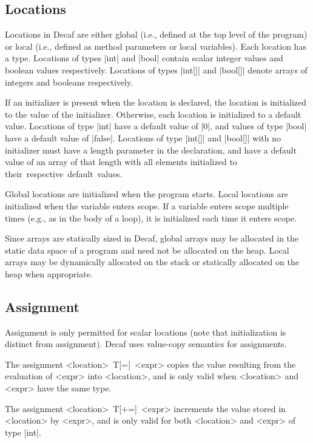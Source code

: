 \documentclass[11pt]{article}
\begin{document}
\subsection{Locations}

Locations in Decaf are either global (i.e., defined at the top level of the program) or local (i.e., defined as method parameters or local variables).
Each location has a type.
Locations of types \decaf|int| and \decaf|bool| contain scalar integer values and boolean values respectively.
Locations of types \decaf|int[]| and \decaf|bool[]| denote arrays of integers and booleans respectively.

If an initializer is present when the location is declared, the location is initialized to the value of the initializer.
Otherwise, each location is initialized to a default value.
Locations of type \decaf|int| have a default value of \decaf|0|, and values of type \decaf|bool| have a default value of \decaf|false|.
Locations of type \decaf|int[]| and \decaf|bool[]| with no initializer must have a length parameter in the declaration, and have a default value of an array of that length with all elements initialized to their~respective~default~values.

Global locations are initialized when the program starts.
Local locations are initialized when the variable enters scope.
If a variable enters scope multiple times (e.g., as in the body of a loop), it is initialized each time it enters scope.

Since arrays are statically sized in Decaf, global arrays may be allocated in the static data space of a program and need not be allocated on the heap.
Local arrays may be dynamically allocated on the stack or statically allocated on the heap when appropriate.

\subsection{Assignment}

Assignment is only permitted for scalar locations (note that initialization is distinct from assignment).
Decaf uses value-copy semantics for assignments.

The assignment {\bnf <location>~T[=]~<expr>} copies the value resulting from the evaluation of {\bnf <expr>} into {\bnf <location>}, and is only valid when {\bnf <location>} and {\bnf <expr>} have the same type.

The assignment {\bnf <location>~T[+=]~<expr>} increments the value stored in {\bnf <location>} by {\bnf <expr>}, and is only valid for both {\bnf <location>} and {\bnf <expr>} of type \decaf|int|.
\end{document}
